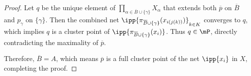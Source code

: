 \documentclass[12pt,english]{article}
\begin{document}
\begin{proof}
Let $q$ be the unique element of $\prod_{\alpha \in \overline{B} \cup \{\gamma\}} X_\alpha$ that extends both $\overline{p}$ on $\overline{B}$ and $p_\gamma$ on $\{\gamma\}$. Then the combined net $\ipp{ \pi_{\overline{B} \cup \{\gamma\}}(x_{i(j(k))}) }_{k \in K}$ converges to $q$, which implies $q$ is a cluster point of $\ipp{ \pi_{\overline{B} \cup \{\gamma\}}(x_i) }$. Thus $q \in \mP$, directly contradicting the maximality of $\overline{p}$.

Therefore, $\overline{B} = A$, which means $\overline{p}$ is a full cluster point of the net $\ipp{ x_i }$ in $X$, completing the proof.
\end{proof}
\end{document}
